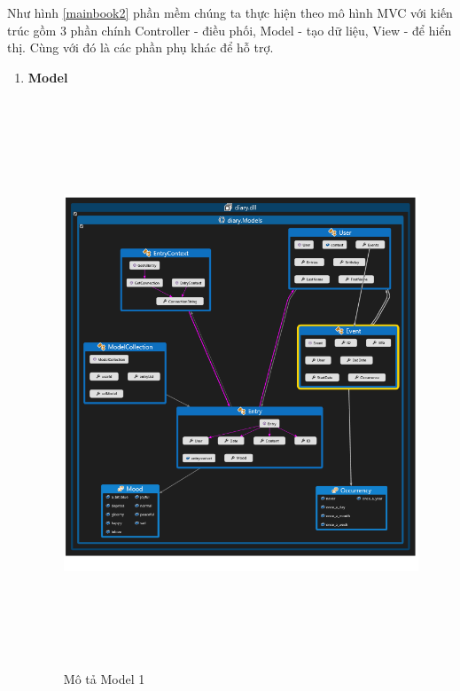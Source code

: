\documentclass[a4paper]{article}
\begin{document}
Như hình \ref{mainbook2} phần mềm chúng ta thực hiện theo mô hình MVC với kiến trúc gồm 3 phần chính Controller - điều phối, Model - tạo dữ liệu, View - để hiển thị. Cùng với đó là các phần phụ khác để hỗ trợ.


\begin{enumerate}
	\item \textbf{Model}

			\begin{figure}[!h]
	 			\centering
      			\includegraphics[height=480pt,width=440pt]{Images/h4.png}
	 		 	\caption{Mô tả Model 1}
	 		 	\label{mainbook3}
	  		\end{figure}


	  \newpage



\end{enumerate}
\end{document}
